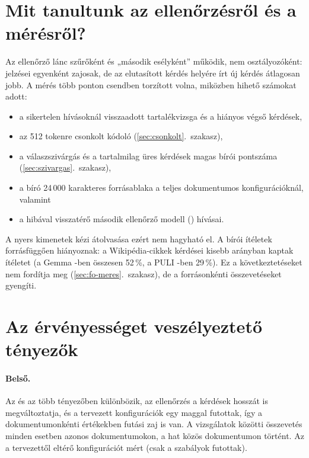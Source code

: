 \section{Mit tanultunk az ellenőrzésről és a mérésről?}
\label{sec:meres-tanulsag}

Az ellenőrző lánc szűrőként és „második esélyként” működik, nem osztályozóként: jelzései egyenként
zajosak, de az elutasított kérdés helyére írt új kérdés átlagosan jobb. A mérés több ponton csendben
torzított volna, miközben hihető számokat adott:
\begin{itemize}[leftmargin=*,itemsep=1pt,topsep=2pt]
\item a sikertelen hívásoknál visszaadott tartalékvizsga és a hiányos végső kérdések,
\item az 512 tokenre csonkolt kódoló (\ref{sec:csonkolt}.~szakasz),
\item a válaszszivárgás és a tartalmilag üres kérdések magas bírói pontszáma (\ref{sec:szivargas}.~szakasz),
\item a bíró 24\,000 karakteres forrásablaka a teljes dokumentumos konfigurációknál, valamint
\item a hibával visszatérő második ellenőrző modell () hívásai.
\end{itemize}
A nyers kimenetek kézi átolvasása ezért nem hagyható el. A bírói ítéletek forrásfüggően hiányoznak: a
Wikipédia-cikkek kérdései kisebb arányban kaptak ítéletet (a Gemma -ben összesen 52\,\%, a PULI
-ben 29\,\%). Ez a következtetéseket nem fordítja meg (\ref{sec:fo-meres}.~szakasz), de a forrásonkénti
összevetéseket gyengíti.

\section{Az érvényességet veszélyeztető tényezők}
\label{sec:validitas}

\paragraph{Belső.} Az  és az  több tényezőben különbözik, az ellenőrzés a kérdések hosszát is
megváltoztatja, és a tervezett konfigurációk egy maggal futottak, így a dokumentumonkénti értékekben futási
zaj is van. A vizsgálatok közötti összevetés minden esetben azonos dokumentumokon, a hat közös
dokumentumon történt. Az  a tervezettől eltérő konfigurációt mért (csak a szabályok futottak).
